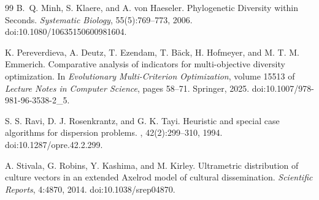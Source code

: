 \documentclass[11pt]{article}
\begin{document}
\begin{thebibliography}{99}
B.~Q. Minh, S. Klaere, and A. von Haeseler.
Phylogenetic Diversity within Seconds.
\emph{Systematic Biology}, 55(5):769--773, 2006.
doi:10.1080/10635150600981604.

K. Pereverdieva, A. Deutz, T. Ezendam, T. B\"ack, H. Hofmeyer, and M. T. M. Emmerich.
\newblock Comparative analysis of indicators for multi-objective diversity optimization.
\newblock In \emph{Evolutionary Multi-Criterion Optimization}, volume 15513 of \emph{Lecture Notes in Computer Science}, pages 58--71. Springer, 2025.
\newblock doi:10.1007/978-981-96-3538-2\_5.

S. S. Ravi, D. J. Rosenkrantz, and G. K. Tayi.
\newblock Heuristic and special case algorithms for dispersion problems.
, 42(2):299--310, 1994.
\newblock doi:10.1287/opre.42.2.299.

A. Stivala, G. Robins, Y. Kashima, and M. Kirley.
\newblock Ultrametric distribution of culture vectors in an extended Axelrod model of cultural dissemination.
\newblock \emph{Scientific Reports}, 4:4870, 2014.
\newblock doi:10.1038/srep04870.





\end{thebibliography}
\end{document}
